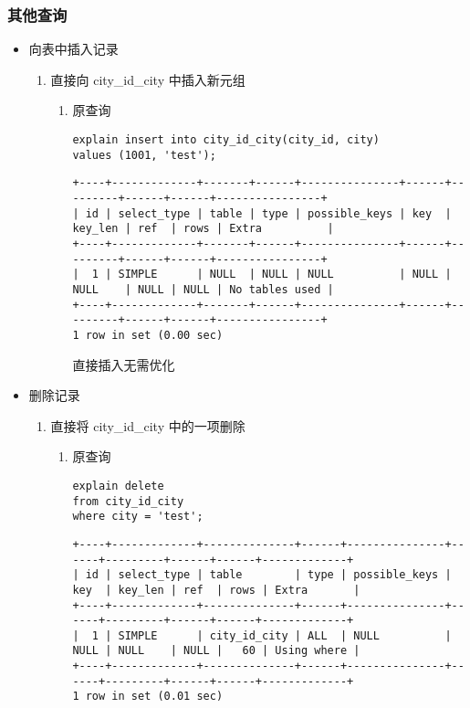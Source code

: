 \documentclass[11pt]{article}
\begin{document}
\subsubsection{其他查询}
\label{sec-3-2-3}
\begin{itemize}
\item 向表中插入记录
\label{sec-3-2-3-1}
\begin{enumerate}
\item 直接向 city\_id\_city 中插入新元组
\begin{enumerate}
\item 原查询

\begin{lstlisting}
explain insert into city_id_city(city_id, city)
values (1001, 'test');
\end{lstlisting}

\begin{verbatim}
+----+-------------+-------+------+---------------+------+---------+------+------+----------------+
| id | select_type | table | type | possible_keys | key  | key_len | ref  | rows | Extra          |
+----+-------------+-------+------+---------------+------+---------+------+------+----------------+
|  1 | SIMPLE      | NULL  | NULL | NULL          | NULL | NULL    | NULL | NULL | No tables used |
+----+-------------+-------+------+---------------+------+---------+------+------+----------------+
1 row in set (0.00 sec)
\end{verbatim}

直接插入无需优化
\end{enumerate}
\end{enumerate}
\item 删除记录
\label{sec-3-2-3-2}
\begin{enumerate}
\item 直接将 city\_id\_city 中的一项删除
\begin{enumerate}
\item 原查询

\begin{lstlisting}
explain delete
from city_id_city
where city = 'test';
\end{lstlisting}

\begin{verbatim}
+----+-------------+--------------+------+---------------+------+---------+------+------+-------------+
| id | select_type | table        | type | possible_keys | key  | key_len | ref  | rows | Extra       |
+----+-------------+--------------+------+---------------+------+---------+------+------+-------------+
|  1 | SIMPLE      | city_id_city | ALL  | NULL          | NULL | NULL    | NULL |   60 | Using where |
+----+-------------+--------------+------+---------------+------+---------+------+------+-------------+
1 row in set (0.01 sec)
\end{verbatim}


\end{enumerate}
\end{enumerate}
\end{itemize}
\end{document}
